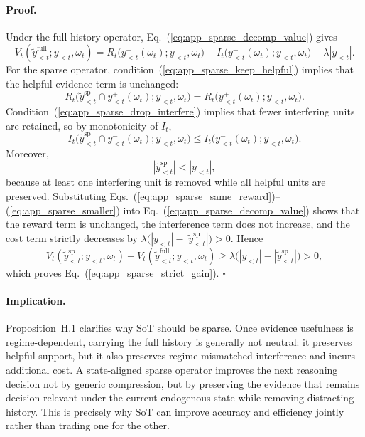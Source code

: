 \paragraph{Proof.}
Under the full-history operator, Eq.~(\ref{eq:app_sparse_decomp_value}) gives
\begin{equation}
V_t(\widetilde y_{<t}^{\mathrm{full}}; y_{<t}, \omega_t)
=
R_t\!\bigl(y_{<t}^{+}(\omega_t); y_{<t},\omega_t\bigr)
-
I_t\!\bigl(y_{<t}^{-}(\omega_t); y_{<t},\omega_t\bigr)
-
\lambda |y_{<t}|.
\label{eq:app_sparse_full_value}
\end{equation}
For the sparse operator, condition~(\ref{eq:app_sparse_keep_helpful}) implies that the helpful-evidence term is unchanged:
\begin{equation}
R_t\!\bigl(\widetilde y_{<t}^{\mathrm{sp}}\cap y_{<t}^{+}(\omega_t); y_{<t},\omega_t\bigr)
=
R_t\!\bigl(y_{<t}^{+}(\omega_t); y_{<t},\omega_t\bigr).
\label{eq:app_sparse_same_reward}
\end{equation}
Condition~(\ref{eq:app_sparse_drop_interfere}) implies that fewer interfering units are retained, so by monotonicity of \(I_t\),
\begin{equation}
I_t\!\bigl(\widetilde y_{<t}^{\mathrm{sp}}\cap y_{<t}^{-}(\omega_t); y_{<t},\omega_t\bigr)
\le
I_t\!\bigl(y_{<t}^{-}(\omega_t); y_{<t},\omega_t\bigr).
\label{eq:app_sparse_less_interference}
\end{equation}
Moreover,
\begin{equation}
|\widetilde y_{<t}^{\mathrm{sp}}|<|y_{<t}|,
\label{eq:app_sparse_smaller}
\end{equation}
because at least one interfering unit is removed while all helpful units are preserved.
Substituting Eqs.~(\ref{eq:app_sparse_same_reward})--(\ref{eq:app_sparse_smaller}) into Eq.~(\ref{eq:app_sparse_decomp_value}) shows that the reward term is unchanged, the interference term does not increase, and the cost term strictly decreases by
\(\lambda\bigl(|y_{<t}|-|\widetilde y_{<t}^{\mathrm{sp}}|\bigr)>0\).
Hence
\begin{equation}
V_t(\widetilde y_{<t}^{\mathrm{sp}}; y_{<t}, \omega_t)
-
V_t(\widetilde y_{<t}^{\mathrm{full}}; y_{<t}, \omega_t)
\ge
\lambda\bigl(|y_{<t}|-|\widetilde y_{<t}^{\mathrm{sp}}|\bigr)
>0,
\end{equation}
which proves Eq.~(\ref{eq:app_sparse_strict_gain}).
\hfill\(\square\)

\paragraph{Implication.}
Proposition~H.1 clarifies why SoT should be sparse.
Once evidence usefulness is regime-dependent, carrying the full history is generally not neutral: it preserves helpful support, but it also preserves regime-mismatched interference and incurs additional cost.
A state-aligned sparse operator improves the next reasoning decision not by generic compression, but by preserving the evidence that remains decision-relevant under the current endogenous state while removing distracting history.
This is precisely why SoT can improve accuracy and efficiency jointly rather than trading one for the other.

